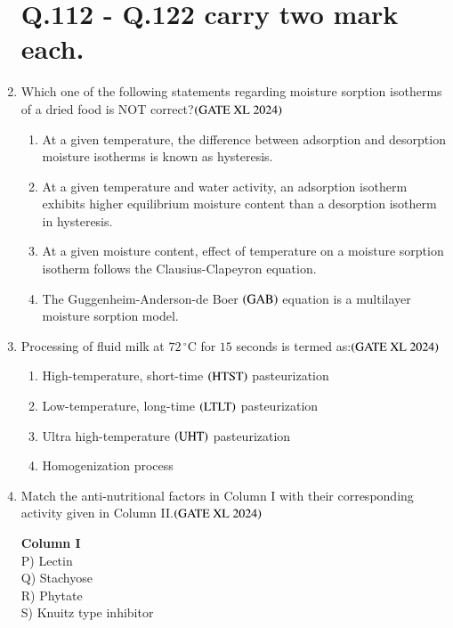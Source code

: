 \documentclass[journal]{IEEEtran}
\begin{document}
\begin{enumerate}
\section*{Q.112 - Q.122 carry two mark each.} 
    \item Which one of the following statements regarding moisture sorption isotherms of a dried food is NOT correct?\hfill $\left(\text{GATE XL 2024}\right)$
    \begin{enumerate}
        \item At a given temperature, the difference between adsorption and desorption moisture isotherms is known as hysteresis.
        \item At a given temperature and water activity, an adsorption isotherm exhibits higher equilibrium moisture content than a desorption isotherm in hysteresis.
        \item At a given moisture content, effect of temperature on a moisture sorption isotherm follows the Clausius-Clapeyron equation.
        \item The Guggenheim-Anderson-de Boer $\left(\text{GAB}\right)$ equation is a multilayer moisture sorption model.
    \end{enumerate}

    \item Processing of fluid milk at $72\,^\circ$C for $15$ seconds is termed as:\hfill $\left(\text{GATE XL 2024}\right)$
    \begin{enumerate}
            \item High-temperature, short-time $\left(\text{HTST}\right)$ pasteurization
            \item Low-temperature, long-time $\left(\text{LTLT}\right)$ pasteurization
            \item Ultra high-temperature $\left(\text{UHT}\right)$ pasteurization
            \item Homogenization process
    \end{enumerate}

    \item Match the anti-nutritional factors in Column I with their corresponding activity given in Column II.\hfill $\left(\text{GATE XL 2024}\right)$
    \begin{multicols}{2}
    \noindent \textbf{Column I} \\
    P) Lectin \\
    Q) Stachyose \\
    R) Phytate \\
    S) Knuitz type inhibitor \\


\end{multicols}
\end{enumerate}
\end{document}
